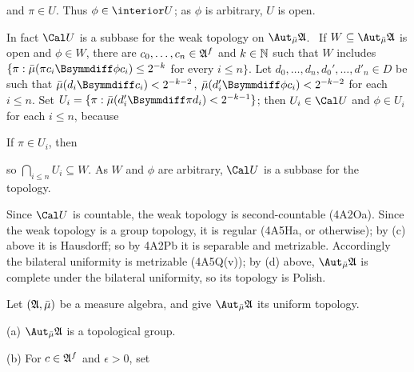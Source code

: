 {

\noindent and $\pi\in U$.   Thus $\phi\in\interior U$;  as $\phi$ is
arbitrary, $U$ is open.\ \Qed

\medskip

 In fact $\Cal U$ is a subbase for the weak topology on
$\AmuA$.   \Prf\ If $W\subseteq\AmuA$ is open and $\phi\in W$, there are
$c_0,\ldots,c_n\in\frak A^f$ and $k\in\Bbb N$
such that $W$ includes
$\{\pi:\bar\mu(\pi c_i\Bsymmdiff\phi c_i)\le 2^{-k}$ for every
$i\le n\}$.   Let $d_0,\ldots,d_n,d_0',\ldots,d'_n\in D$ be such that
$\bar\mu(d_i\Bsymmdiff c_i)<2^{-k-2}$,
$\bar\mu(d'_i\Bsymmdiff\phi c_i)<2^{-k-2}$ for each $i\le n$.   Set
$U_i=\{\pi:\bar\mu(d'_i\Bsymmdiff\pi d_i)<2^{-k-1}\}$;  then
$U_i\in\Cal U$ and $\phi\in U_i$ for each $i\le n$, because


\noindent If $\pi\in U_i$, then


\noindent so $\bigcap_{i\le n}U_i\subseteq W$.   As $W$ and $\phi$ are
arbitrary, $\Cal U$ is a subbase for the topology.\ \Qed

\medskip

 Since $\Cal U$ is countable, the weak topology is
second-countable (4A2Oa).   Since the weak topology is a group
topology, it is regular (4A5Ha, or otherwise);  by (c) above it is
Hausdorff;  so by 4A2Pb it is separable and metrizable.   Accordingly the
bilateral uniformity is metrizable (4A5Q(v));  by (d) above, $\AmuA$ is
complete under the bilateral uniformity, so its topology is Polish.
}%

Let $(\frak A,\bar\mu)$ be a measure algebra, and give
$\AmuA$ its uniform topology.

(a) $\AmuA$ is a topological group.

(b) For $c\in\frak A^f$ and $\epsilon>0$, set


